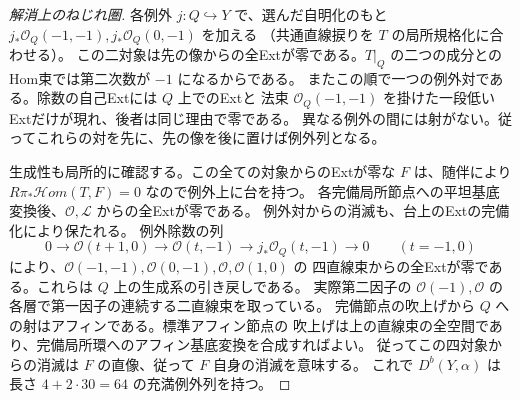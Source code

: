 \begin{proof}[解消上のねじれ圏]
各例外 $j:Q\hookrightarrow Y$ で、選んだ自明化のもと
$j_*\mathcal O_Q(-1,-1),j_*\mathcal O_Q(0,-1)$ を加える
（共通直線捩りを $T$ の局所規格化に合わせる）。
この二対象は先の像からの全Extが零である。$T|_Q$ の二つの成分との
Hom束では第二次数が $-1$ になるからである。
またこの順で一つの例外対である。除数の自己Extには $Q$ 上でのExtと
法束 $\mathcal O_Q(-1,-1)$ を掛けた一段低いExtだけが現れ、後者は同じ理由で零である。
異なる例外の間には射がない。従ってこれらの対を先に、先の像を後に置けば例外列となる。

生成性も局所的に確認する。この全ての対象からのExtが零な $F$ は、随伴により
$R\pi_*\mathcal Hom(T,F)=0$ なので例外上に台を持つ。
各完備局所節点への平坦基底変換後、$\mathcal O,\mathcal L$ からの全Extが零である。
例外対からの消滅も、台上のExtの完備化により保たれる。
例外除数の列
\[
 0\to\mathcal O(t+1,0)\to\mathcal O(t,-1)
        \to j_*\mathcal O_Q(t,-1)\to0\qquad(t=-1,0)
\]
により、$\mathcal O(-1,-1),\mathcal O(0,-1),\mathcal O,\mathcal O(1,0)$ の
四直線束からの全Extが零である。これらは $Q$ 上の生成系の引き戻しである。
実際第二因子の $\mathcal O(-1),\mathcal O$ の各層で第一因子の連続する二直線束を取っている。
完備節点の吹上げから $Q$ への射はアフィンである。標準アフィン節点の
吹上げは上の直線束の全空間であり、完備局所環へのアフィン基底変換を合成すればよい。
従ってこの四対象からの消滅は $F$ の直像、従って $F$ 自身の消滅を意味する。
これで $D^b(Y,\alpha)$ は長さ $4+2\cdot30=64$ の充満例外列を持つ。
\end{proof}


